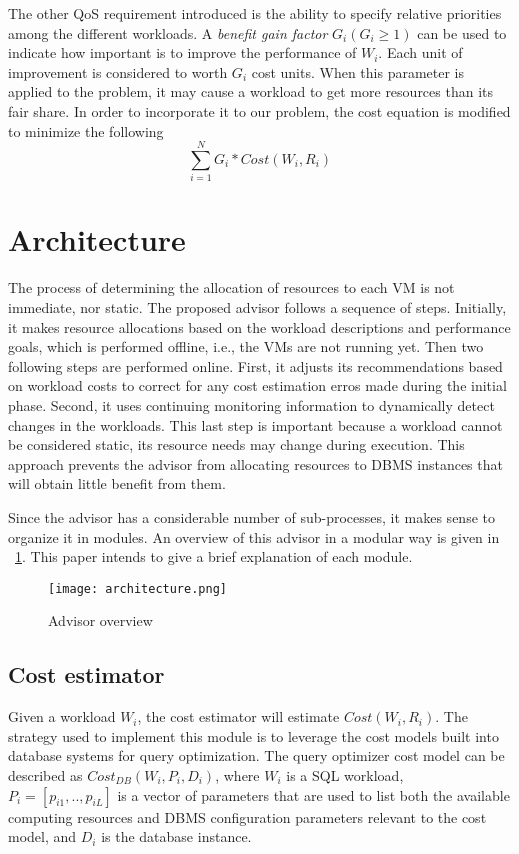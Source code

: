 The other QoS requirement introduced is the ability to specify relative priorities among the different workloads. A \textit{benefit gain factor} $G_{i} (G_{i} \geq 1)$ can be used to indicate how important is to improve the performance of $W_{i}$. Each unit of improvement is considered to worth $G_{i}$ cost units. When this parameter is applied to the problem, it may cause a workload to get more resources than its fair share. In order to incorporate it to our problem, the cost equation is modified to minimize the following
\[
  \sum_{i=1}^{N} G_{i} * Cost(W_{i},R_{i})
\]


\section{Architecture}

The process of  determining the allocation of resources to each VM is not immediate, nor static. The proposed advisor follows a sequence of steps. Initially, it makes resource allocations based on the workload descriptions and performance goals, which is performed offline, i.e., the VMs are not running yet. Then two following steps are performed online. First, it adjusts its recommendations based on workload costs to correct for any cost estimation erros made during the initial phase. Second, it uses continuing monitoring information to dynamically detect changes in the workloads. This last step is important because a workload cannot be considered static, its resource needs may change during execution. This approach prevents the advisor from allocating resources to DBMS instances that will obtain little benefit from them.

Since the advisor has a considerable number of sub-processes, it makes sense to organize it in modules. An overview of this advisor in a modular way is given in ~\ref{fig:architecture}. This paper intends to give a brief explanation of each module.


\begin{figure}[ht]
\centering
\texttt{[image: architecture.png]}
\caption{Advisor overview}
\label{fig:architecture}
\end{figure} 

\subsection{Cost estimator}

Given a workload $W_{i}$, the cost estimator will estimate $Cost(W_{i},R_{i})$. The strategy used to implement this module is to leverage the cost models built into database systems for query optimization. The query optimizer cost model can be described as $Cost_{DB}(W_{i},P_{i},D_{i})$, where $W_{i}$ is a SQL workload, $P_{i} = [p_{i1},..,p_{iL}]$ is a vector of parameters that are used to list both the available computing resources and DBMS configuration parameters relevant to the cost model, and $D_{i}$ is  the database instance. 

